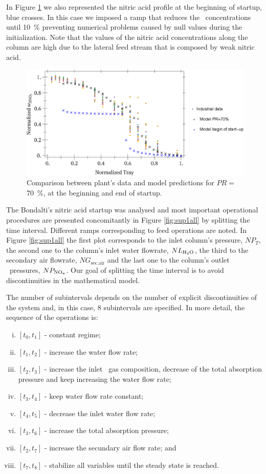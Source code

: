 \documentclass[journal=jacsat,manuscript=article]{achemso}
\newcommand{\nox}{\ce{NO_{\rmfamily{x}}}}
\newcommand{\hdoiso}{\ce{H2O}}
\begin{document}
In Figure \ref{fig:wstartup} we also represented the nitric acid profile at the beginning of startup, blue crosses.
In this case we imposed a ramp that reduces the \nox~concentrations until \SI{10}{\percent} preventing numerical problems caused by null values during the initialization.   
Note that the values of the nitric acid concentrations along the column are high due to the lateral feed stream that is composed by weak nitric acid. 
\begin{figure}[htb]
	\centering
	\includegraphics[width=\textwidth]{figure4.eps}
	\caption{Comparison between plant's data and model predictions for $PR=$\SI{70}{\percent}, at the beginning and end of startup.}
	\label{fig:wstartup}
\end{figure}

The Bondalti's nitric acid startup was analysed and most important operational procedures are presented concomitantly in Figure \ref{fig:sup1all} by splitting the time interval. Different ramps corresponding to feed operations are noted. In Figure \ref{fig:sup1all} the first plot corresponds to the inlet column's pressure, $NP_T$, the second one to the column's inlet water flowrate, $NL_{\text{\hdoiso}}$, the third to the secondary air flowrate, $NG_{\text{sec.air}}$ and the last one to the column's outlet \nox~pressures, $NP_{\text{\nox}}$.
Our goal of splitting the time interval is to avoid discontinuities in the mathematical model.


The number of subintervals depends on the number of explicit discontinuities of the system and, in this case, 8 subintervals are specified. In more detail, the sequence of the operations is:


\begin{enumerate}[(i)]
	\item $[t_0,t_1]$ - constant regime;
	\item $[t_1,t_2]$ - increase the water flow rate;
	\item $[t_2,t_3]$ - increase the inlet \nox~gas composition, decrease of the total absorption pressure and keep increasing the water flow rate;
	\item $[t_3,t_4]$ - keep water flow rate constant;
	\item $[t_4,t_5]$ - decrease the inlet water flow rate;
	\item $[t_3,t_6]$ - increase the total absorption pressure;
	\item $[t_2,t_7]$ - increase the secundary air flow rate; and
	\item $[t_7,t_8]$ - stabilize all variables until the steady state is reached.
\end{enumerate}
\end{document}
